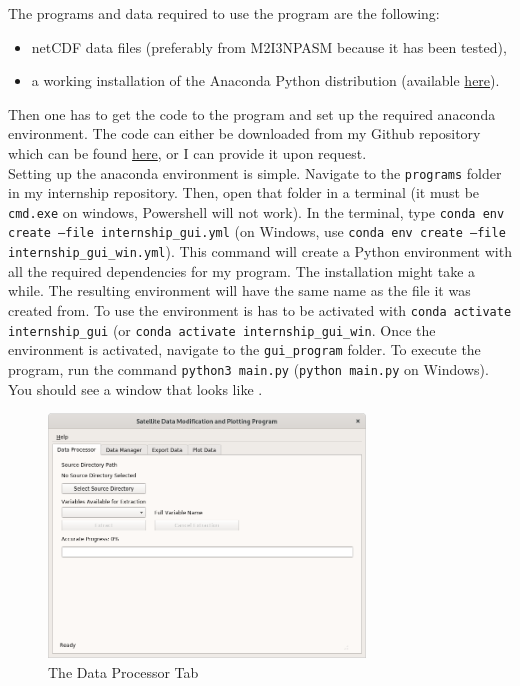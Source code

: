 \documentclass[../00_main.tex]{subfiles}
\begin{document}
The programs and data required to use the program are the following:
\begin{itemize}
    \item netCDF data files (preferably from M2I3NPASM because it has been
        tested),
    \item a working installation of the Anaconda Python distribution (available
        \href{https://www.anaconda.com/products/individual}{here}).
\end{itemize}
Then one has to get the code to the program and set up the required anaconda 
environment. The code can either be downloaded from my Github repository which
can be found \href{https://github.com/moritz-konarski/internship}{here}, or I 
can provide it upon request. \\
Setting up the anaconda environment is simple.
Navigate to the \texttt{programs} folder in my internship repository. Then,
open that folder in a terminal (it must be \texttt{cmd.exe} on windows,
Powershell will not work). In the terminal, type \texttt{conda env create
--file internship\_gui.yml} (on Windows, use \texttt{conda env create
--file internship\_gui\_win.yml}). This command will create a Python
environment with all the required dependencies for my program. The installation
might take a while. The resulting environment
will have the same name as the file it was created from. To use the environment
is has to be activated with \texttt{conda activate internship\_gui} (or 
\texttt{conda activate internship\_gui\_win}. Once the environment is
activated, navigate to the \texttt{gui\_program} folder. To execute the
program, run the command \texttt{python3 main.py} (\texttt{python main.py} on
Windows). You should see a window that looks like .
\begin{figure}[H]
    \center
    \includegraphics[width=0.75\textwidth]{../graphics/dp01}
    \caption{The Data Processor Tab}
    \label{dp01}
\end{figure}
\end{document}
